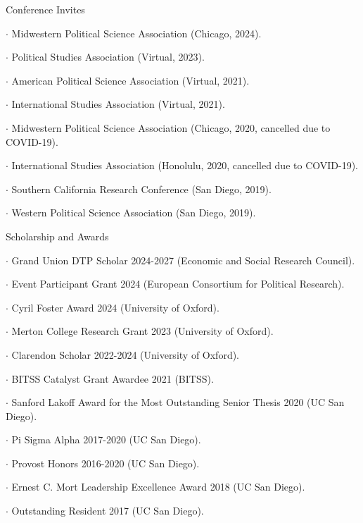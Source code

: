 \documentclass[10pt]{resume} %
\begin{document}
	\begin{rSection}{Conference Invites}
		\itemsep -5pt
		\item $\cdot$ Midwestern Political Science Association (Chicago, 2024).
		\item $\cdot$ Political Studies Association (Virtual, 2023).
		\item $\cdot$ American Political Science Association (Virtual, 2021).
		\item $\cdot$ International Studies Association (Virtual, 2021).
		\item $\cdot$ Midwestern Political Science Association (Chicago, 2020, cancelled due to COVID-19).
		\item $\cdot$ International Studies Association (Honolulu, 2020, cancelled due to COVID-19).
		\item $\cdot$ Southern California Research Conference (San Diego, 2019).
		\item $\cdot$ Western Political Science Association (San Diego, 2019).
	\end{rSection}
	
	\begin{rSection}{Scholarship and Awards}
		\itemsep -5pt
		\item $\cdot$ Grand Union DTP Scholar 2024-2027 (Economic and Social Research Council).
		\item $\cdot$ Event Participant Grant 2024 (European Consortium for Political Research).
		\item $\cdot$ Cyril Foster Award 2024 (University of Oxford).
		\item $\cdot$ Merton College Research Grant 2023 (University of Oxford).
		\item $\cdot$ Clarendon Scholar 2022-2024 (University of Oxford).
		\item $\cdot$ BITSS Catalyst Grant Awardee 2021 (BITSS).
		\item $\cdot$ Sanford Lakoff Award for the Most Outstanding Senior Thesis 2020 (UC San Diego).
		\item $\cdot$ Pi Sigma Alpha 2017-2020 (UC San Diego). 
		\item $\cdot$ Provost Honors 2016-2020 (UC San Diego). 
		\item $\cdot$ Ernest C. Mort Leadership Excellence Award 2018 (UC San Diego). 
		\item $\cdot$ Outstanding Resident 2017 (UC San Diego).
	\end{rSection}
	
\end{document}
